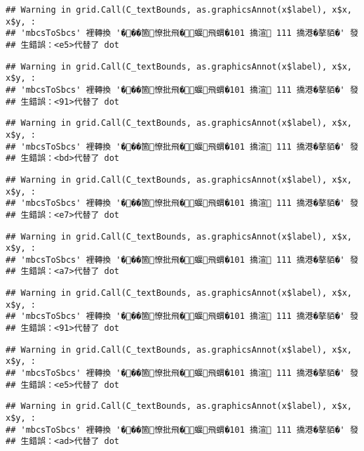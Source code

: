 \documentclass[
]{article}
\begin{document}
\begin{verbatim}
## Warning in grid.Call(C_textBounds, as.graphicsAnnot(x$label), x$x, x$y, :
## 'mbcsToSbcs' 裡轉換 '���箇憭批飛�蝘飛蝟�101 撟渲 111 撟港�摮貊�' 發
## 生錯誤：<e5>代替了 dot
\end{verbatim}

\begin{verbatim}
## Warning in grid.Call(C_textBounds, as.graphicsAnnot(x$label), x$x, x$y, :
## 'mbcsToSbcs' 裡轉換 '���箇憭批飛�蝘飛蝟�101 撟渲 111 撟港�摮貊�' 發
## 生錯誤：<91>代替了 dot
\end{verbatim}

\begin{verbatim}
## Warning in grid.Call(C_textBounds, as.graphicsAnnot(x$label), x$x, x$y, :
## 'mbcsToSbcs' 裡轉換 '���箇憭批飛�蝘飛蝟�101 撟渲 111 撟港�摮貊�' 發
## 生錯誤：<bd>代替了 dot
\end{verbatim}

\begin{verbatim}
## Warning in grid.Call(C_textBounds, as.graphicsAnnot(x$label), x$x, x$y, :
## 'mbcsToSbcs' 裡轉換 '���箇憭批飛�蝘飛蝟�101 撟渲 111 撟港�摮貊�' 發
## 生錯誤：<e7>代替了 dot
\end{verbatim}

\begin{verbatim}
## Warning in grid.Call(C_textBounds, as.graphicsAnnot(x$label), x$x, x$y, :
## 'mbcsToSbcs' 裡轉換 '���箇憭批飛�蝘飛蝟�101 撟渲 111 撟港�摮貊�' 發
## 生錯誤：<a7>代替了 dot
\end{verbatim}

\begin{verbatim}
## Warning in grid.Call(C_textBounds, as.graphicsAnnot(x$label), x$x, x$y, :
## 'mbcsToSbcs' 裡轉換 '���箇憭批飛�蝘飛蝟�101 撟渲 111 撟港�摮貊�' 發
## 生錯誤：<91>代替了 dot
\end{verbatim}

\begin{verbatim}
## Warning in grid.Call(C_textBounds, as.graphicsAnnot(x$label), x$x, x$y, :
## 'mbcsToSbcs' 裡轉換 '���箇憭批飛�蝘飛蝟�101 撟渲 111 撟港�摮貊�' 發
## 生錯誤：<e5>代替了 dot
\end{verbatim}

\begin{verbatim}
## Warning in grid.Call(C_textBounds, as.graphicsAnnot(x$label), x$x, x$y, :
## 'mbcsToSbcs' 裡轉換 '���箇憭批飛�蝘飛蝟�101 撟渲 111 撟港�摮貊�' 發
## 生錯誤：<ad>代替了 dot
\end{verbatim}
\end{document}
